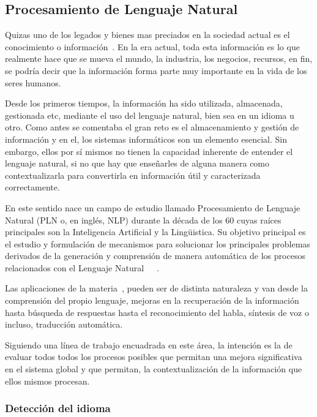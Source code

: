 \documentclass[runningheads,a4paper]{llncs}
\theoremstyle{break}
\begin{document}
\subsection{Procesamiento de Lenguaje Natural}

Quizas uno de los legados y bienes mas preciados en la sociedad actual es el conocimiento o información~\cite{nlp:1}. En la era actual, toda esta información es lo que realmente hace que se mueva el mundo, la industria, los negocios, recursos, en fin, se podría decir que la información forma parte muy importante en la vida de los seres humanos.

Desde los primeros tiempos, la información ha sido utilizada, almacenada, gestionada etc, mediante el uso del lenguaje natural, bien sea en un idioma u otro. Como antes se comentaba el gran reto es el almacenamiento y gestión de información y en el, los sistemas informáticos son un elemento esencial. Sin embargo, ellos por sí mismos no tienen la capacidad inherente de entender el lenguaje natural, si no que hay que enseñarles de alguna manera como contextualizarla para convertirla en información útil y caracterizada correctamente.

En este sentido nace un campo de estudio llamado Procesamiento de Lenguaje Natural (PLN o, en inglés, NLP) durante la década de los 60 cuyas raíces principales son la Inteligencia Artificial y la Lingüistica. Su objetivo principal es el estudio y formulación de mecanismos para solucionar los principales problemas derivados de la generación y comprensión de manera automática de los procesos relacionados con el Lenguaje Natural~\cite{nlp:2}~\cite{nlp:3}~\cite{nlp:5}.

Las aplicaciones de la materia~\cite{nlp:4}, pueden ser de distinta naturaleza y van desde la comprensión del propio lenguaje, mejoras en la recuperación de la información hasta búsqueda de respuestas hasta el reconocimiento del habla, síntesis de voz o incluso, traducción automática.

Siguiendo una línea de trabajo encuadrada en este área, la intención es la de evaluar todos todos los procesos posibles que permitan una mejora significativa en el sistema global y que permitan, la contextualización de la información que ellos mismos procesan.

\subsubsection{Detección del idioma}
\textbf{}
\end{document}
